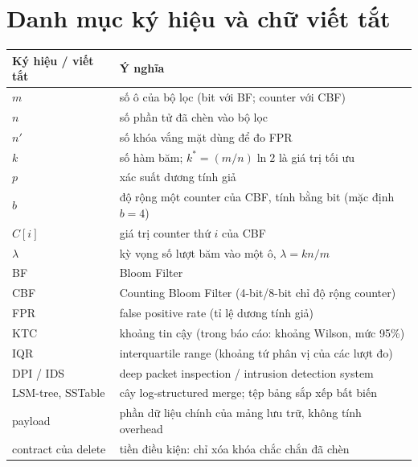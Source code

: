 \documentclass[11pt,a4paper]{article}
\begin{document}
\tableofcontents
\listoffigures
\listoftables
\newpage

\section*{Danh mục ký hiệu và chữ viết tắt}
\begin{center}
\renewcommand{\arraystretch}{1.2}
\begin{tabular}{@{}l>{\raggedright\arraybackslash}p{}@{}}
\toprule
Ký hiệu / viết tắt & Ý nghĩa \\
\midrule
$m$ & số ô của bộ lọc (bit với BF; counter với CBF) \\
$n$ & số phần tử đã chèn vào bộ lọc \\
$n'$ & số khóa vắng mặt dùng để đo FPR \\
$k$ & số hàm băm; $k^{*}=(m/n)\ln 2$ là giá trị tối ưu \\
$p$ & xác suất dương tính giả \\
$b$ & độ rộng một counter của CBF, tính bằng bit (mặc định $b=4$) \\
$C[i]$ & giá trị counter thứ $i$ của CBF \\
$\lambda$ & kỳ vọng số lượt băm vào một ô, $\lambda=kn/m$ \\
BF & Bloom Filter \\
CBF & Counting Bloom Filter (4-bit/8-bit chỉ độ rộng counter) \\
FPR & false positive rate (tỉ lệ dương tính giả) \\
KTC & khoảng tin cậy (trong báo cáo: khoảng Wilson, mức 95\%) \\
IQR & interquartile range (khoảng tứ phân vị của các lượt đo) \\
DPI / IDS & deep packet inspection / intrusion detection system \\
LSM-tree, SSTable & cây log-structured merge; tệp bảng sắp xếp bất biến \\
payload & phần dữ liệu chính của mảng lưu trữ, không tính overhead \\
contract của delete & tiền điều kiện: chỉ xóa khóa chắc chắn đã chèn \\
\bottomrule
\end{tabular}
\end{center}
\newpage
\end{document}
